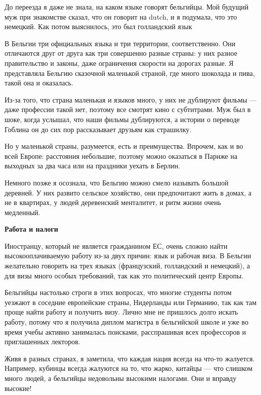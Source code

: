 \begin{fancyquotes}
    До переезда я даже не знала, на каком языке говорят бельгийцы. Мой будущий муж при знакомстве сказал, что он говорит на dutch, и я подумала, что это немецкий. Как потом выяснилось, это был голландский язык
\end{fancyquotes}

В Бельгии три официальных языка и три территории, соответственно. Они отличаются друг от друга как три совершенно разные страны: у них разное правительство и законы, даже ограничения скорости на дорогах разные. Я представляла Бельгию сказочной маленькой страной, где много шоколада и пива, такой она и оказалась.

Из-за того, что страна маленькая и языков много, у них не дублируют фильмы — даже профессии такой нет, поэтому все смотрят кино с субтитрами. Муж был в шоке, когда услышал, что наши фильмы дублируются, а истории о переводе Гоблина он до сих пор рассказывает друзьям как страшилку.

Но у маленькой страны, разумеется, есть и преимущества. Впрочем, как и во всей Европе: расстояния небольшие, поэтому можно оказаться в Париже на выходных за два часа или на праздники уехать в Берлин.

Немного позже я осознала, что Бельгию можно смело называть большой деревней. У них развито сельское хозяйство, они предпочитают жить в домах, а не в квартирах, у людей деревенский менталитет, и ритм жизни очень медленный.

\textbf{Работа и налоги}

Иностранцу, который не является гражданином ЕС, очень сложно найти высокооплачиваемую работу из-за двух причин: язык и рабочая виза. В Бельгии желательно говорить на трех языках (французский, голландский и немецкий), а для визы много особых требований, так как это политический центр Европы.

Бельгийцы настолько строги в этих вопросах, что многие студенты потом уезжают в соседние европейские страны, Нидерланды или Германию, так как там проще найти работу и получить визу. Лично мне не пришлось долго искать работу, потому что я получила диплом магистра в бельгийской школе и уже во время учебы активно занималась поисками, расспрашивая всех профессоров и приглашенных лекторов.

Живя в разных странах, я заметила, что каждая нация всегда на что-то жалуется. Например, кубинцы всегда жалуются на то, что жарко, китайцы — что слишком много людей, а бельгийцы недовольны высокими налогами. Они и вправду высокие!


